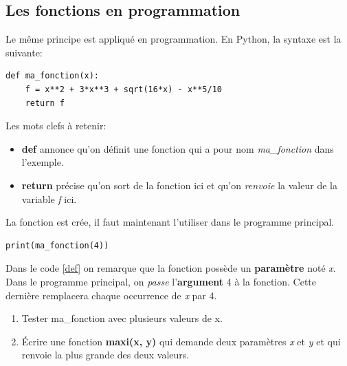 \documentclass[a4paper,11pt]{article}
\begin{document}
\begin{Form}
\begin{figure}[!h]
\label{fonction}
\end{figure}
\subsection{Les fonctions en programmation}
Le même principe est appliqué en programmation. En Python, la syntaxe est la suivante:
\begin{code}[!h]
\begin{lstlisting}
def ma_fonction(x):
	f = x**2 + 3*x**3 + sqrt(16*x) - x**5/10
	return f
\end{lstlisting}
\label{def}
\end{code}

Les mots clefs à retenir:
\begin{itemize}
\item \textbf{def} annonce qu'on définit une fonction qui a pour nom \emph{ma\_fonction} dans l'exemple.
\item \textbf{return} précise qu'on sort de la fonction ici et qu'on \emph{renvoie} la valeur de la variable \emph{f} ici.
\end{itemize}
La fonction est crée, il faut maintenant l'utiliser dans le programme principal.
\begin{lstlisting}
print(ma_fonction(4))
\end{lstlisting}
Dans le code \ref{def} on remarque que la fonction possède un \textbf{paramètre} noté \emph{x}. Dans le programme principal, on \emph{passe} l'\textbf{argument} 4 à la fonction. Cette dernière remplacera chaque occurrence de \emph{x} par 4.
\begin{activite}
\begin{enumerate}
\item Tester ma\_fonction avec plusieurs valeurs de x.
\item Écrire une fonction \textbf{maxi(x, y)} qui demande deux paramètres \emph{x} et \emph{y} et qui renvoie la plus grande des deux valeurs.
\end{enumerate}
\end{activite}

\end{Form}
\end{document}
